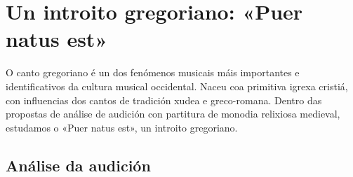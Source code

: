 %
%
\section{Un introito gregoriano: «Puer natus est»}
%
O canto gregoriano é un dos fenómenos musicais máis importantes e identificativos da cultura musical occidental. Naceu coa primitiva igrexa cristiá, con influencias dos cantos de tradición  xudea e greco-romana.
%
Dentro das propostas de análise de audición con partitura de monodia relixiosa medieval, estudamos o «Puer natus est», un introito gregoriano.
%
\subsection*{Análise da audición} \label{Pasos}

